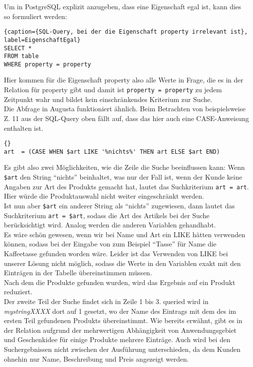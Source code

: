 Um in PostgreSQL explizit anzugeben, dass eine Eigenschaft egal ist, kann dies so formuliert werden:
\begin{lstlisting}{caption={SQL-Query, bei der die Eigenschaft property irrelevant ist}, label=EigenschaftEgal}
SELECT *
FROM table
WHERE property = property
\end{lstlisting}
Hier kommen für die Eigenschaft property also alle Werte in Frage, die es in der Relation für property gibt und damit ist \lstinline{property = property} zu jedem Zeitpunkt wahr und bildet kein einschränkendes Kriterium zur Suche.\\
Die Abfrage in Augusta funktioniert ähnlich. Beim Betrachten von beispielsweise Z. 11 aus der SQL-Query oben fällt auf, dass das hier auch eine CASE-Anweisung enthalten ist.
\begin{lstlisting}{}
art  = (CASE WHEN $art LIKE '%nichts%' THEN art ELSE $art END)
\end{lstlisting}
Es gibt also zwei Möglichkeiten, wie die Zeile die Suche beeinflussen kann: Wenn \lstinline|$art| den String "`nichts"' beinhaltet, was nur der Fall ist, wenn der Kunde keine Angaben zur Art des Produkts gemacht hat, lautet das Suchkriterium \lstinline|art = art|. Hier würde die Produktauswahl nicht weiter eingeschränkt werden.\\
Ist nun aber \lstinline{$art} ein anderer String als "`nichts"' zugewiesen, dann lautet das Suchkriterium \lstinline|art = $art|, sodass die Art des Artikels bei der Suche berücksichtigt wird. Analog werden die anderen Variablen gehandhabt.\\
Es wäre schön gewesen, wenn wir bei Name und Art ein LIKE hätten verwenden können, sodass bei der Eingabe von zum Beispiel "`Tasse"' für Name die Kaffeetasse gefunden worden wäre. Leider ist das Verwenden von LIKE bei unserer Lösung nicht möglich, sodass die Werte in den Variablen exakt mit den Einträgen in der Tabelle übereinstimmen müssen.\\
Nach dem die Produkte gefunden wurden, wird das Ergebnis auf ein Produkt reduziert.\\
Der zweite Teil der Suche findet sich in Zeile 1 bis 3. queried wird in \textit{mystringXXXX} dort auf 1 gesetzt, wo der Name des Eintrags mit dem des im ersten Teil gefundenen Produkts übereinstimmt. Wie bereits erwähnt, gibt es in der Relation aufgrund der mehrwertigen Abhängigkeit von Anwendungsgebiet und Geschenkidee für einige Produkte mehrere Einträge. Auch wird bei den Suchergebnissen nicht zwischen der Ausführung unterschieden, da dem Kunden ohnehin nur Name, Beschreibung und Preis angezeigt werden.\\



